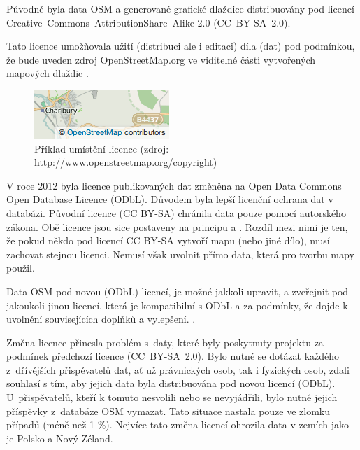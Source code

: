 Původně byla data OSM a generované grafické dlaždice distribuovány pod licencí
Creative~Commons~AttributionShare~Alike 2.0 (CC~BY-SA~2.0).

Tato licence umožňovala užití (distribuci ale i editaci) díla (dat) pod podmínkou,
že bude uveden zdroj OpenStreetMap.org ve viditelné části
vytvořených mapových dlaždic \cite{OSMlicence}.

  \begin{figure}[hbt]
    \centering
      \includegraphics[scale=0.75]{./pictures/attribution_example.png}
      \caption{Příklad umístění licence 
                (zdroj: \url{http://www.openstreetmap.org/copyright})}
      \label{fig:attribution_example}
  \end{figure} 

V roce 2012 byla licence publikovaných dat změněna na Open Data Commons
Open Database Licence (ODbL).
Důvodem byla lepší licenční ochrana dat v databázi. 
Původní licence (CC BY-SA) chránila data pouze pomocí autorského zákona. 
Obě licence jsou sice postaveny na principu  a . Rozdíl mezi nimi je ten, že pokud někdo pod licencí CC BY-SA vytvoří mapu (nebo jiné dílo), musí zachovat stejnou licenci.
Nemusí však uvolnit přímo data, která pro tvorbu mapy použil.

Data OSM pod novou (ODbL) licencí, je možné jakkoli upravit,
a zveřejnit pod jakoukoli jinou licencí, 
která je kompatibilní s ODbL a 
za podmínky, že dojde k uvolnění souvisejících doplňků a vylepšení. \cite{OSMlicenceChange}.

Změna licence přinesla problém
s~daty, které byly poskytnuty projektu za podmínek předchozí licence
(CC~BY-SA~2.0). Bylo nutné se dotázat každého z~dřívějších
přispěvatelů dat, ať už právnických osob, tak i fyzických osob,
zdali souhlasí s tím, aby jejich data byla distribuována pod novou licencí (ODbL).
U~přispěvatelů, kteří k tomuto nesvolili nebo se nevyjádřili,
bylo nutné jejich příspěvky z~databáze OSM vymazat.
Tato situace nastala pouze ve zlomku případů (méně než 1 \%).
Nejvíce tato změna licencí ohrozila data v zemích jako je Polsko a Nový Zéland. \cite {OSMlicenceIssue}

